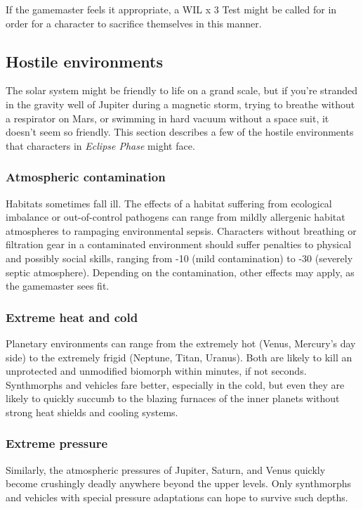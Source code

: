 If the gamemaster feels it appropriate, a WIL x 3 Test might be called for in order for a character to sacrifice themselves in this manner.

\subsection{Hostile environments}
\label{sec:hostile-environments}
The solar system might be friendly to life on a grand scale, but if you’re stranded in the gravity well of Jupiter during a magnetic storm, trying to breathe without a respirator on Mars, or swimming in hard vacuum without a space suit, it doesn’t seem so friendly. This section describes a few of the hostile environments that characters in \emph{Eclipse Phase} might face.

\subsubsection{Atmospheric contamination}

Habitats sometimes fall ill. The effects of a habitat suffering from ecological imbalance or out-of-control pathogens can range from mildly allergenic habitat atmospheres to rampaging environmental sepsis. Characters without breathing or filtration gear in a contaminated environment should suffer penalties to physical and possibly social skills, ranging from -10 (mild contamination) to -30 (severely septic atmosphere). Depending on the contamination, other effects may apply, as the gamemaster sees fit.

\subsubsection{Extreme heat and cold}

Planetary environments can range from the extremely hot (Venus, Mercury’s day side) to the extremely frigid (Neptune, Titan, Uranus). Both are likely to kill an unprotected and unmodified biomorph within minutes, if not seconds. Synthmorphs and vehicles fare better, especially in the cold, but even they are likely to quickly succumb to the blazing furnaces of the inner planets without strong heat shields and cooling systems.

\subsubsection{Extreme pressure}

Similarly, the atmospheric pressures of Jupiter, Saturn, and Venus quickly become crushingly deadly anywhere beyond the upper levels. Only synthmorphs and vehicles with special pressure adaptations can hope to survive such depths.

